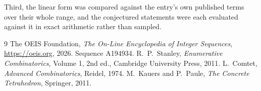 \documentclass[11pt,a4paper]{article}
\theoremstyle{plain}
\theoremstyle{definition}
\begin{document}
Third, the linear form was compared against the entry's own published terms over their whole
range, and the conjectured statements were each evaluated against it in exact arithmetic
rather than sampled.

\begin{thebibliography}{9}
 The OEIS Foundation, \emph{The On-Line Encyclopedia of Integer
Sequences}, \url{https://oeis.org}, 2026. Sequence A194934.
 R.~P.~Stanley, \emph{Enumerative Combinatorics}, Volume 1, 2nd ed.,
Cambridge University Press, 2011.
 L.~Comtet, \emph{Advanced Combinatorics}, Reidel, 1974.
 M.~Kauers and P.~Paule, \emph{The Concrete Tetrahedron}, Springer, 2011.
\end{thebibliography}
\end{document}
